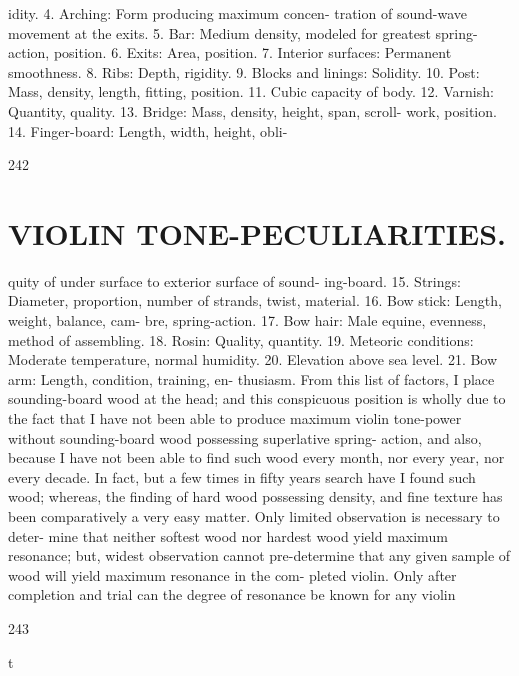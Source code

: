 \documentclass{article}
\begin{document}
idity. 4. Arching: Form producing maximum concen- tration of sound-wave movement at the exits. 5. Bar: Medium density, modeled for greatest spring-action, position. 6. Exits: Area, position. 7. Interior surfaces: Permanent smoothness. 8. Ribs: Depth, rigidity. 9. Blocks and linings: Solidity. 10. Post: Mass, density, length, fitting, position. 11. Cubic capacity of body. 12. Varnish: Quantity, quality. 13. Bridge: Mass, density, height, span, scroll- work, position. 14. Finger-board: Length, width, height, obli-

242

\section*{VIOLIN TONE-PECULIARITIES.}
quity of under surface to exterior surface of sound- ing-board. 15. Strings: Diameter, proportion, number of strands, twist, material. 16. Bow stick: Length, weight, balance, cam- bre, spring-action. 17. Bow hair: Male equine, evenness, method of assembling. 18. Rosin: Quality, quantity. 19. Meteoric conditions: Moderate temperature, normal humidity. 20. Elevation above sea level. 21. Bow arm: Length, condition, training, en- thusiasm. From this list of factors, I place sounding-board wood at the head; and this conspicuous position is wholly due to the fact that I have not been able to produce maximum violin tone-power without sounding-board wood possessing superlative spring- action, and also, because I have not been able to find such wood every month, nor every year, nor every decade. In fact, but a few times in fifty years search have I found such wood; whereas, the finding of hard wood possessing density, and fine texture has been comparatively a very easy matter. Only limited observation is necessary to deter- mine that neither softest wood nor hardest wood yield maximum resonance; but, widest observation cannot pre-determine that any given sample of wood will yield maximum resonance in the com- pleted violin. Only after completion and trial can the degree of resonance be known for any violin

243

t
\end{document}
